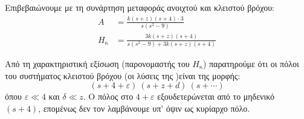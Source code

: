 \documentclass[11pt,a4paper,notitlepage,fleqn,final]{article}
\begin{document}
\begin{exercise}
\begin{enumgreekparen}
	Επιβεβαιώνουμε με τη συνάρτηση μεταφοράς ανοιχτού και κλειστού βρόχου:
	\begin{align*}
		A &= \frac{k(s+z)(s+4)\cdot 3}{s(s^2-9)}\\
		H_{\text{κ}} &= \frac{3k(s+z)(s+4)}{s(s^2-9)+3k(s+z)(s+4)}
	\end{align*}
	
	Από τη χαρακτηριστική εξίσωση (παρονομαστής του \( H_{\text{κ}} \))
	παρατηρούμε ότι οι πόλοι του συστήματος κλειστού βρόχου (οι λύσεις της )είναι της μορφής:
	\[
	(s+4+ε)\ (s+z+d)\ (s+\cdots)
	\]
	όπου \( ε\ll 4 \) και \( δ\ll z \). Ο πόλος στο \( 4+ε \) εξουδετερώνεται από το μηδενικό
	\( (s+4) \), επομένως δεν τον λαμβάνουμε υπ' όψιν ως κυρίαρχο πόλο.
\end{enumgreekparen}

\end{exercise}
\end{document}
